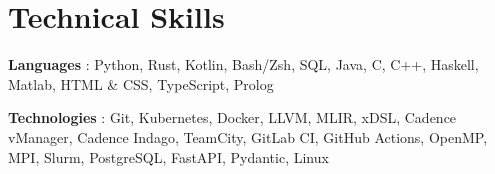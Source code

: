 \documentclass[letterpaper,11pt]{article}
\begin{document}
%



%
\section{Technical Skills}
\begin{itemize}[leftmargin=0.15in, label={}]
 \small{
   \item{
       \textbf{Languages}
       {: Python, Rust, Kotlin, Bash/Zsh, SQL, Java, C, C++, Haskell, Matlab, HTML \& CSS, TypeScript, Prolog} \\
   }
   \vspace{-0.25em}
   \item{
       \textbf{Technologies}
       {: Git, Kubernetes, Docker, LLVM, MLIR, xDSL, Cadence vManager, Cadence Indago,  TeamCity, GitLab CI, GitHub Actions, OpenMP, MPI, Slurm, PostgreSQL, FastAPI, Pydantic, Linux} \\
   }
 }
\end{itemize}



\end{document}
